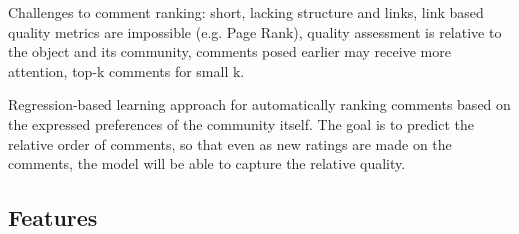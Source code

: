 \documentclass{article}
\begin{document}
Challenges to comment ranking: short, lacking structure and links, link based quality metrics are impossible (e.g. Page Rank), quality assessment is relative to the object and its community, comments posed earlier may receive more attention, top-k comments for small k.

Regression-based learning approach for automatically ranking comments based on the expressed preferences of the community itself. The goal is to predict the relative order of comments, so that even as new ratings are made on the comments, the model will be able to capture the relative quality.

\subsection{Features} 
\end{document}
